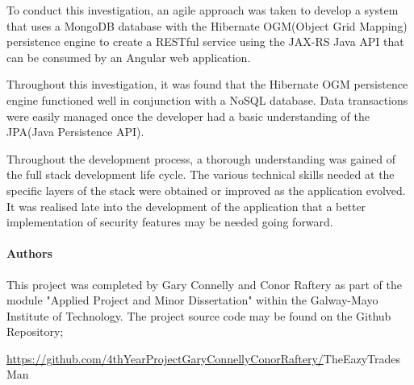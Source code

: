 \documentclass[12pt,a4paper,oneside,openany]{book}
\begin{document}
\bigskip

To conduct this investigation, an agile approach was taken to develop a system that uses a MongoDB database with the Hibernate OGM(Object Grid Mapping) persistence engine to create a RESTful service using the JAX-RS Java API that can be consumed by an Angular web application.

\bigskip
Throughout this investigation, it was found that the Hibernate OGM persistence engine functioned well in conjunction with a NoSQL database. Data transactions were easily managed once the developer had a basic understanding of the JPA(Java Persistence API).

\bigskip

Throughout the development process, a thorough understanding was gained of the full stack development life cycle. The various technical skills needed at the specific layers of the stack were obtained or improved as the application evolved. It was realised late into the development of the application that a better implementation of security features may be needed going forward. 

\paragraph{Authors}
This project was completed by Gary Connelly and Conor Raftery as part of the module "Applied Project and Minor Dissertation" within the Galway-Mayo Institute of Technology. The project source code may be found on the Github Repository;

\noindent\href{https://github.com/4thYearProjectGaryConnellyConorRaftery/TheEazyTradesMan}{https://github.com/4thYearProjectGaryConnellyConorRaftery/}TheEazyTrades Man



  
  
  \tableofcontents
  \listoffigures
  
  
  
\end{document}
